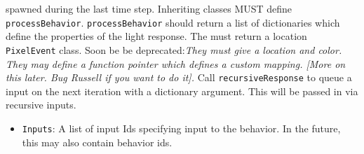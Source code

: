 \documentclass{article}
\begin{document}
\begin{itemize}
{spawned during the last time step.  Inheriting classes MUST define
\texttt{processBehavior}.  \texttt{processBehavior} should return a list of dictionaries which
define the properties of the light response.  The must return a location
\texttt{PixelEvent} class.  Soon be be deprecated:\textit{They must give a location and
color.  They may define a function pointer which defines a custom mapping.
[More on this later.  Bug Russell if you want to do it].}
Call \texttt{recursiveResponse} to queue a input on the next iteration with a dictionary
argument.  This will be passed in via recursive inputs.}
{\begin{itemize}
    \item \texttt{Inputs}: A list of input Ids specifying input to the
        behavior.  In the future, this may also contain behavior ids.
\end{itemize}}

\end{itemize}
\end{document}

